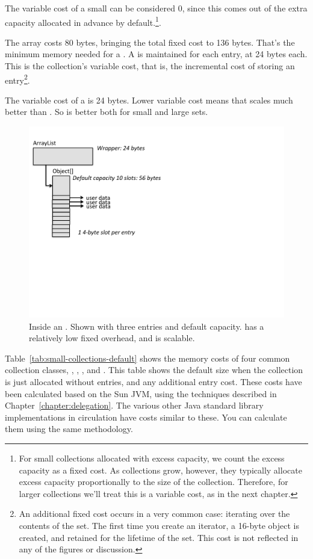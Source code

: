 The variable cost of a small
 can be considered 0, since this comes out of the extra
capacity allocated in advance by default.\footnote{For small
collections allocated with excess capacity, we count the excess capacity as a
fixed cost. As collections grow, however, they typically allocate excess
capacity proportionally to the size of the collection. Therefore, for larger
collections we'll treat this is a variable cost, as
in the next chapter.}.

The array costs 80 bytes, bringing the total fixed
cost to 136 bytes. That's the minimum memory needed for a .
A  is maintained for
each entry, at 24 bytes each. This is the collection's variable
cost, that is, the incremental cost of storing an
entry\footnote{An additional fixed cost occurs in a very common case:
iterating over the contents of the set.
The first time you create an iterator, a 16-byte  object
is created, and retained for the lifetime of the set. This
cost is not reflected in any of the figures or discussion.}.



 The variable cost of a  is 24 bytes. Lower variable
cost means that  scales much better than . So  is better both for small and large sets.
 \begin{figure}
  \centering
 \includegraphics[width=.80\textwidth]{part1/Figures/collections/inside-arraylist.pdf}
 \caption{Inside an . Shown with three
 entries and default capacity.  has a relatively low
 fixed overhead, and is scalable.}
  \label{fig:inside-arraylist}
\end{figure}
 

Table~\ref{tab:small-collections-default} shows the memory costs of four common
collection classes, , , , and
.
This table shows the default size when the collection is just allocated without
entries, and any additional entry cost. These costs have
been calculated based on the Sun JVM, using the techniques described in Chapter~\ref{chapter:delegation}. 
The various other Java standard
library implementations in circulation have costs
similar to these. You can calculate them using the same methodology.


